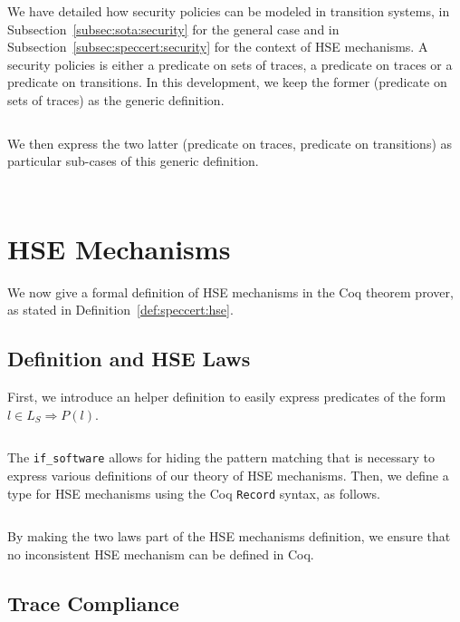 We have detailed how security policies can be modeled in transition systems, in
Subsection~\ref{subsec:sota:security} for the general case and in
Subsection~\ref{subsec:speccert:security} for the context of HSE mechanisms.
%
A security policies is either a predicate on sets of traces, a predicate on
traces or a predicate on transitions.
%
In this development, we keep the former (predicate on sets of traces) as the
generic definition.

\inputminted[gobble=2,firstline=90,lastline=92]{coq}{Listings/SpecCert.v}

We then express the two latter (predicate on traces, predicate on transitions)
as particular sub-cases of this generic definition.

\inputminted[gobble=2,firstline=94,lastline=99]{coq}{Listings/SpecCert.v}

\inputminted[gobble=2,firstline=101,lastline=110]{coq}{Listings/SpecCert.v}

\section{HSE Mechanisms}

We now give a formal definition of HSE mechanisms in the Coq theorem prover,
as stated in Definition~\ref{def:speccert:hse}.

\subsection{Definition and HSE Laws}

First, we introduce an helper definition to easily express predicates of the
form \( l \in L_S \Rightarrow P(l) \).

\inputminted[gobble=2,firstline=112,lastline=121]{coq}{Listings/SpecCert.v}

The \texttt{if\_software} allows for hiding the pattern matching that is
necessary to express various definitions of our theory of HSE mechanisms.
%
Then, we define a type for HSE mechanisms using the Coq \texttt{Record} syntax,
as follows.

\inputminted[gobble=2,firstline=123,lastline=139]{coq}{Listings/SpecCert.v}

By making the two laws part of the HSE mechanisms definition, we ensure that no
inconsistent HSE mechanism can be defined in Coq.

\subsection{Trace Compliance}

